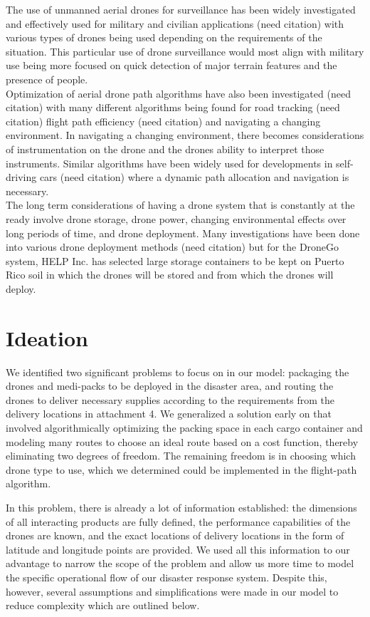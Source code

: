 \documentclass[twocolumn,10pt]{asme2ej}
\begin{document}
The use of unmanned aerial drones for surveillance has been widely investigated and effectively used for military and civilian applications (need citation) with various types of drones being used depending on the requirements of the situation. This particular use of drone surveillance would most align with military use being more focused on quick detection of major terrain features and the presence of people. \\
Optimization of aerial drone path algorithms have also been investigated (need citation) with many different algorithms being found for road tracking (need citation) flight path efficiency (need citation) and navigating a changing environment. In navigating a changing environment, there becomes considerations of instrumentation on the drone and the drones ability to interpret those instruments. Similar algorithms have been widely used for developments in self-driving cars (need citation) where a dynamic path allocation and navigation is necessary. \\
The long term considerations of having a drone system that is constantly at the ready involve drone storage, drone power, changing environmental effects over long periods of time, and drone deployment. Many investigations have been done into various drone deployment methods (need citation) but for the DroneGo system, HELP Inc. has selected large storage containers to be kept on Puerto Rico soil in which the drones will be stored and from which the drones will deploy.

\section{Ideation}
We identified two significant problems to focus on in our model: packaging the drones and medi-packs to be deployed in the disaster area, and routing the drones to deliver necessary supplies according to the requirements from the delivery locations in attachment 4. We generalized a solution early on that involved algorithmically optimizing the packing space in each cargo container and modeling many routes to choose an ideal route based on a cost function, thereby eliminating two degrees of freedom. The remaining freedom is in choosing which drone type to use, which we determined could be implemented in the flight-path algorithm.

In this problem, there is already a lot of information established: the dimensions of all interacting products are fully defined, the performance capabilities of the drones are known, and the exact locations of delivery locations in the form of latitude and longitude points are provided. We used all this information to our advantage to narrow the scope of the problem and allow us more time to model the specific operational flow of our disaster response system. Despite this, however, several assumptions and simplifications were made in our model to reduce complexity which are outlined below.
\end{document}
